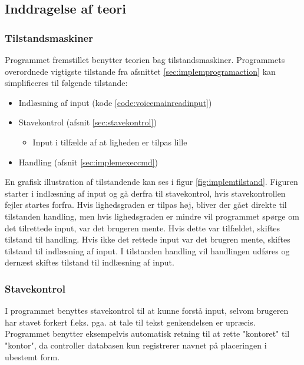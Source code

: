 \subsection{Inddragelse af teori}
\subsubsection{Tilstandsmaskiner}\label{sec:implemtilstandsmaskine}
Programmet fremstillet benytter teorien bag tilstandsmaskiner. Programmets overordnede vigtigste tilstande fra afsnittet \ref{sec:implemprogramaction} kan simplificeres til følgende tilstande:
\begin{itemize}
    \item Indlæsning af input (kode \ref{code:voicemainreadinput})
    \item Stavekontrol (afsnit \ref{sec:stavekontrol})
    \begin{itemize}
        \item Input i tilfælde af at ligheden er tilpas lille
    \end{itemize}
    \item Handling (afsnit \ref{sec:implemexeccmd})
\end{itemize}
En grafisk illustration af tilstandende kan ses i figur \ref{fig:implemtilstand}. Figuren starter i indlæsning af input og gå derfra til stavekontrol, hvis stavekontrollen fejler startes forfra. Hvis lighedsgraden er tilpas høj, bliver der gået direkte til tilstanden handling, men hvis lighedsgraden er mindre vil programmet spørge om det tilrettede input, var det brugeren mente. Hvis dette var tilfældet, skiftes tilstand til handling. Hvis ikke det rettede input var det brugren mente, skiftes tilstand til indlæsning af input. I tilstanden handling vil handlingen udføres og dernæst skiftes tilstand til indlæsning af input.


\subsubsection{Stavekontrol}\label{sec:impl-stavekontrol}
I programmet benyttes stavekontrol til at kunne forstå input, selvom brugeren har stavet forkert f.eks. pga. at tale til tekst genkendelsen er upræcis. Programmet benytter eksempelvis automatisk retning til at rette "kontoret" til "kontor", da controller databasen kun registrerer navnet på placeringen i ubestemt form.\\

